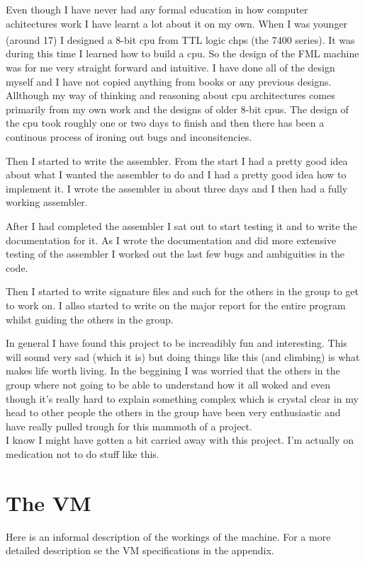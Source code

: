 \documentclass{article}
\begin{document}
Even though I have never had any formal education in how computer achitectures
work I have learnt a lot about it on my own. When I was younger (around 17) I
designed a 8-bit cpu from TTL logic chps (the 7400
series\textsuperscript{\cite{7400}}). It was during this time I learned how to
build a cpu. So the design of the FML machine was for me very straight forward
and intuitive.
I have done all of the design myself and I have not
copied anything from books or any previous designs. Allthough my way of thinking
and reasoning about cpu architectures comes primarily from my own work and the
designs of older 8-bit cpus. The design of the cpu took roughly one or two days
to finish and then there has been a continous process of ironing out bugs and
inconsitencies.

Then I started to write the assembler. From the start I had a pretty good idea
about what I wanted the assembler to do and I had a pretty good idea how to
implement it. I wrote the assembler in about three days and I then had a fully
working assembler.

After I had completed the assembler I sat out to start testing it and to write
the documentation for it. As I wrote the documentation and did more extensive
testing of the assembler I worked out the last few bugs and ambiguities in the
code.

Then I started to write signature files and such for the others in the group to
get to work on. I allso started to write on the major report for the entire
program whilst guiding the others in the group.

In general I have found this project to be increadibly fun and interesting.
This will sound very sad (which it is) but doing things like this (and climbing)
is what makes life worth living. In the beggining I was worried that the others
in the group where not going to be able to understand how it all woked and even 
though it's really hard to explain something complex which is crystal clear in 
my head to other people the others in
the group have been very enthusiastic and have really pulled trough for this
mammoth of a project.
\\
I know I might have gotten a bit carried away with this project. I'm actually on
medication not to do stuff like this.


\section{The VM}
Here is an informal description of the workings of the machine. For a more
detailed description se the VM specifications in the appendix.
\end{document}
